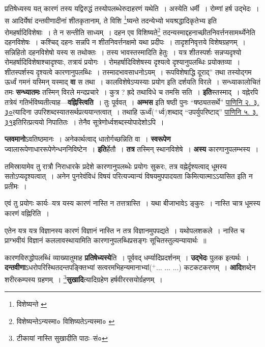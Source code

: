 \documentclass[article,12pt,a4paper]{memoir}
\newcommand{\add}[1]{($^{+}$#1)}
\begin{document}
	प्रतिषेध्यस्य यत् कारणं तस्य यद्विरुद्धं तस्योपलब्धेरुदाहरणं यथेति । अस्येति धर्मी । रोम्णां हर्ष उद्भेदः । स आदिर्येषां दन्तवीणादीनां शीतकृतानाम्, ते विशि \footnote{विशेष्यन्ते \cite{dp-msB}}\-ष्यन्ते तदन्येभ्यो भयश्रद्धादिकृतेभ्य इति रोमहर्षादिविशेषाः । ते न सन्तीति साध्यम् । दहन एव विशिष्यते\footnote{विशेष्यन्तेऽन्यस्मा० \cite{dp-msB} विशिष्यतेऽन्यस्मा० \cite{dp-msC} \cite{dp-msD}} तदन्यस्माद्दहनाच्छीतनिवर्त्तनसामर्थ्येनेति दहनविशेषः । कश्चिद् दहनः सन्नपि न शीतनिवर्त्तनक्षमो यथा प्रदीपः । तादृशनिवृत्तये विशेषग्रहणम् । सन्निहितो दहनविशेषो यस्य स तथोक्तः । तस्य भावस्तस्मादिति हेतुः । यत्र शीतस्पर्शः सन्नप्यदृश्यो रोमहर्षादिविशेषाश्चादृश्याः, तत्रायं प्रयोगः । रोमहर्षादिविशेषस्य दृश्यत्वे दृश्यानुपलब्धिः प्रयोक्तव्या । शीतस्पर्शस्य दृश्यत्वे कारणानुपलब्धिः । तस्मादभावसाधनोऽयम् । रूपविशेषाद्धि दूराद्” तथा तस्योद्गम ऊर्ध्वं गमनं यस्मिन् यस्माद् \textbf{वा} स तथा । कालविशेषेऽप्यस्याः प्रयोग इति दर्शयति विरले । सन्ध्याकालोचितं तमः \textbf{सन्ध्यातमः} तस्मिन् विरले मन्दप्रचारे । कुत्र ? ह्रदे तथाविधे च तमसि सति । \textbf{इति}स्तस्माद् । वह्नेरपि तत्रेयं गतिर्भविष्यतीत्याह—\textbf{वह्निस्त्विति} । तुः पूर्ववत् । \textbf{अम्भस} इति षष्ठी पुनः “षष्ठ्यतसर्थे” \href{http://http://sarit.indology.info/?cref=Pā.2.3.30}{पाणिनि २. ३. ३०}त्यादिना उपरिशब्दस्यातसर्थप्रत्ययान्तत्वात् । तथाहि ऊर्ध्वं\add{र्ध्व}शब्दाद् “उपर्युपरिष्टाद्” \href{http://http://sarit.indology.info/?cref=Pā.5.3.31}{पाणिनि ५. ३. ३१}इतिरित्प्रत्ययो निपातितः । तेनैव सूत्रेणोर्ध्वशब्दस्योपादेशोऽपि ।
	\pend
      

	  \pstart \textbf{प्लवमानो}ऽवतिष्ठमानः । अनेकार्थत्वाद् धातोर्गच्छन्निति वा । \textbf{स्वरूपेण} ज्वालारूपेणाधाररूपेणेन्धननिविष्टेन । \textbf{इति}र्हेतौ । \textbf{तत्र} तस्मिन् स्थानविशेषे । \textbf{अस्य} कारणानुपलम्भस्य ।
	\pend
      

	  \pstart तमिस्रायामेव तु रात्रौ निराधारके प्रदेशे कारणानुपलब्धेः प्रयोगः सुकरः, तत्र वह्नेर्दृश्यत्वाद् धूमस्य सतोऽप्यदृश्यत्वात् । अनेन पुनरेवंविधं विषयं परित्यज्यान्यं विषयमुपपादयता किमित्यात्माऽऽयासित इति न प्रतीमः ।
	\pend
      

	  \pstart एवं तु प्रयोगः कार्यः--यत्र यस्य कारणं नास्ति न तत्तत्रास्ति । यथा बीजाभावेऽ ङ्कुरः । नास्ति चात्र धूमस्य कारणं वह्निरिति ।
	\pend
      

	  \pstart एतेन यत्र यत्र विज्ञानस्य कारणं विज्ञानं नास्ति न तत्र विज्ञानमुपपद्यते । यथोपलशकले । नास्ति च प्राग्भवीयं विज्ञानं कललावस्थायामिति कारणानुपलब्धिप्रसङ्गः सूचितस्तुल्यन्यायार्थः ॥
	\pend
      

	  \pstart कारणविरुद्धोपलब्धिं व्याख्यातुमाह \textbf{प्रतिषेध्यस्ये}ति । पूर्ववद् धर्म्यादिप्रदर्शनम् । \textbf{उद्भेदः} पुलक इत्यर्थः । \textbf{दन्तवीणा}ऽधरोपरिस्थितदन्तपङ्क्तिभ्यां सत्वरमभिहन्यमानाभ्यां\add{... ... ...} कटकटकरणम् । \textbf{आदि}शब्देन शरीरकम्पस्य ग्रहणम् । \footnote{टीकायां नास्ति सुखादीति पाठः--सं०}\textbf{सुखादि}त्यादिग्रहेण हर्षवीररसयोर्ग्रहणम् ।
	\pend
	  \bigskip
	  \begingroup
	
\end{document}

